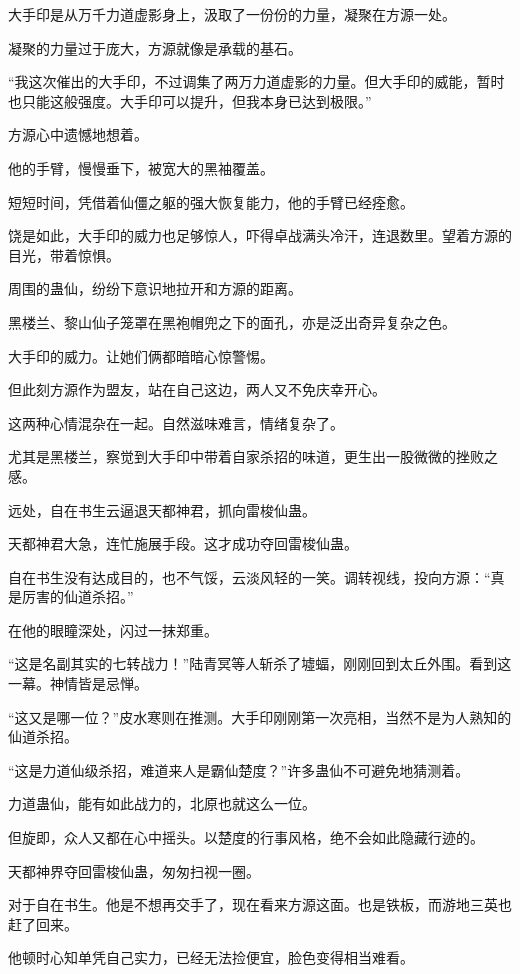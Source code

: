 \begin{this_body}
大手印是从万千力道虚影身上，汲取了一份份的力量，凝聚在方源一处。

凝聚的力量过于庞大，方源就像是承载的基石。

“我这次催出的大手印，不过调集了两万力道虚影的力量。但大手印的威能，暂时也只能这般强度。大手印可以提升，但我本身已达到极限。”

方源心中遗憾地想着。

他的手臂，慢慢垂下，被宽大的黑袖覆盖。

短短时间，凭借着仙僵之躯的强大恢复能力，他的手臂已经痊愈。

饶是如此，大手印的威力也足够惊人，吓得卓战满头冷汗，连退数里。望着方源的目光，带着惊惧。

周围的蛊仙，纷纷下意识地拉开和方源的距离。

黑楼兰、黎山仙子笼罩在黑袍帽兜之下的面孔，亦是泛出奇异复杂之色。

大手印的威力。让她们俩都暗暗心惊警惕。

但此刻方源作为盟友，站在自己这边，两人又不免庆幸开心。

这两种心情混杂在一起。自然滋味难言，情绪复杂了。

尤其是黑楼兰，察觉到大手印中带着自家杀招的味道，更生出一股微微的挫败之感。

远处，自在书生云逼退天都神君，抓向雷梭仙蛊。

天都神君大急，连忙施展手段。这才成功夺回雷梭仙蛊。

自在书生没有达成目的，也不气馁，云淡风轻的一笑。调转视线，投向方源：“真是厉害的仙道杀招。”

在他的眼瞳深处，闪过一抹郑重。

“这是名副其实的七转战力！”陆青冥等人斩杀了墟蝠，刚刚回到太丘外围。看到这一幕。神情皆是忌惮。

“这又是哪一位？”皮水寒则在推测。大手印刚刚第一次亮相，当然不是为人熟知的仙道杀招。

“这是力道仙级杀招，难道来人是霸仙楚度？”许多蛊仙不可避免地猜测着。

力道蛊仙，能有如此战力的，北原也就这么一位。

但旋即，众人又都在心中摇头。以楚度的行事风格，绝不会如此隐藏行迹的。

天都神界夺回雷梭仙蛊，匆匆扫视一圈。

对于自在书生。他是不想再交手了，现在看来方源这面。也是铁板，而游地三英也赶了回来。

他顿时心知单凭自己实力，已经无法捡便宜，脸色变得相当难看。


\end{this_body}
